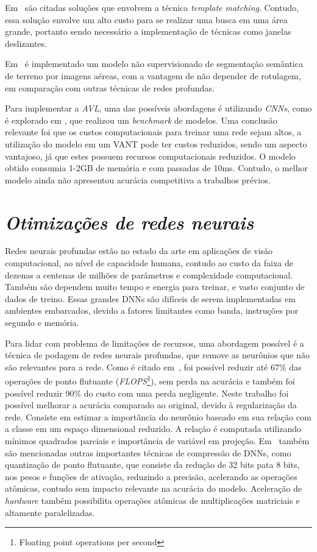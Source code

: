 Em~\cite{COUTURIER2021103666} são citadas soluções que envolvem a técnica \textit{template matching}. Contudo, essa solução envolve um alto custo para se realizar uma busca em uma área grande, portanto sendo necessário a implementação de técnicas como janelas deslizantes. 

Em~\cite{9552597} é implementado um modelo não supervisionado de segmentação semântica de terreno por imagens aéreas, com a vantagem de não depender de rotulagem, em comparação com outras técnicas de redes profundas.

Para implementar a \textit{AVL}, uma das possíveis abordagens é utilizando \textit{CNNs}, como é explorado em \cite{rs13194017}, que realizou um \textit{benchmark} de modelos. Uma conclusão relevante foi que os custos computacionais para treinar uma rede sejam altos, a utilização do modelo em um VANT pode ter custos reduzidos, sendo um aspecto vantajoso, já que estes possuem recursos computacionais reduzidos. O modelo obtido consumia 1-2GB de memória e com passadas de 10ms. Contudo, o melhor modelo ainda não apresentou acurácia competitiva a trabalhos prévios.




\section{\textit{Otimizações de redes neurais}}\label{sec:Cap2_compressao}


Redes neurais profundas estão no estado da arte em aplicações de visão computacional, ao nível de capacidade humana, contudo ao custo da faixa de dezenas a centenas de milhões de parâmetros e complexidade computacional. Também são dependem muito tempo e energia para treinar, e vasto conjunto de dados de treino. Essas grandes DNNs são difíceis de serem implementadas em ambientes embarcados, devido a fatores limitantes como banda, instruções por segundo e memória. 

Para lidar com problema de limitações de recursos, uma abordagem possível é a técnica de podagem de redes neurais profundas, que remove as neurônios que não são relevantes para a rede. Como é citado em~\cite{jordao2019pruning}, foi possível reduzir até 67\% das operações de ponto flutuante (\textit{FLOPS}\footnote{Floating point operations per second }), sem perda na acurácia e também foi possível reduzir 90\% do custo com uma perda negligente. Neste trabalho foi possível melhorar a acurácia comparado ao original, devido à regularização da rede. Consiste em estimar a importância do neurônio baseado em sua relação com a classe em um espaço dimensional reduzido. A relação é computada utilizando mínimos quadrados parciais e importância de variável em projeção. Em~\cite{liang2021pruning} também são mencionadas outras importantes técnicas de compressão de DNNs, como quantização de ponto flutuante, que consiste da redução de 32 bits pata 8 bits, nos pesos e funções de ativação, reduzindo a precisão, acelerando as operações atômicas, contudo sem impacto relevante na acurácia do modelo. Aceleração de \textit{hardware} também possibilita operações atômicas de multiplicações matriciais e altamente paralelizadas. 

